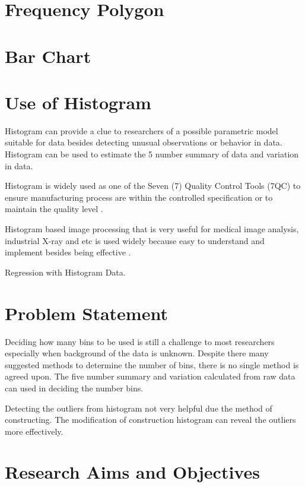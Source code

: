 \section{Frequency Polygon}

\section{Bar Chart}

\section{Use of Histogram}

Histogram can provide a clue to researchers of a possible parametric model suitable for data  \cite[]{wendy2002computational} besides detecting unusual observations or behavior in data. Histogram can be used to estimate the 5 number summary of data and variation in data.

Histogram is widely used as one of the Seven (7) Quality Control Tools (7QC) to ensure manufacturing process are within the controlled specification or to maintain the quality level \cite[]{magar2014application}. 


Histogram based image processing that is very useful for medical image analysis, industrial X-ray and etc is used widely because easy to understand and implement besides being effective \cite[]{sharma2015review}.


Regression with Histogram Data.

\section{Problem Statement}

Deciding how many bins to be used is still a challenge to most researchers especially when background of the data is unknown. Despite there many suggested methods to determine the number of bins, there is no single method is agreed upon. The five number summary and variation calculated from raw data can used in deciding the number bins.

Detecting the outliers from histogram not very helpful due the method of constructing. The modification of construction histogram can reveal the outliers more effectively.


\section{Research Aims and Objectives}

